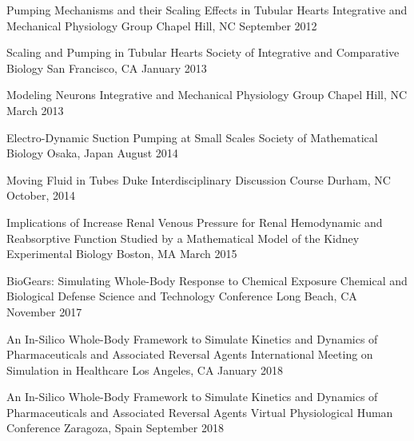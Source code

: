 
\begin{cventries}
    \cventry
    {Pumping Mechanisms and their Scaling Effects in Tubular Hearts} %
    {Integrative and Mechanical Physiology Group} %
    {Chapel Hill, NC} %
    {September 2012} %
    {
    }

    \cventry
    {Scaling and Pumping in Tubular Hearts} %
    {Society of Integrative and Comparative Biology} %
    {San Francisco, CA} %
    {January 2013} %
    {
    }


    \cventry
    {Modeling Neurons} %
    {Integrative and Mechanical Physiology Group} %
    {Chapel Hill, NC} %
    {March 2013} %
    {
    }

    \cventry
    {Electro-Dynamic Suction Pumping at Small Scales} %
    {Society of Mathematical Biology} %
    {Osaka, Japan} %
    {August 2014} %
    {
    }

    \cventry
    {Moving Fluid in Tubes} %
    {Duke Interdisciplinary Discussion Course} %
    {Durham, NC} %
    {October, 2014} %
    {
    }

     \cventry
    {Implications of Increase Renal Venous Pressure for Renal Hemodynamic and Reabsorptive Function Studied by a Mathematical Model of the Kidney} %
    {Experimental Biology} %
    {Boston, MA} %
    {March 2015} %
    {
    }

      \cventry
    {BioGears: Simulating Whole-Body Response to Chemical Exposure} %
    {Chemical and Biological Defense Science and Technology Conference} %
    {Long Beach, CA} %
    {November 2017} %
    {
    }


  \cventry
    {An In-Silico Whole-Body Framework to Simulate Kinetics and Dynamics of Pharmaceuticals and Associated Reversal Agents} %
    {International Meeting on Simulation in Healthcare} %
    {Los Angeles, CA} %
    {January 2018} %
    {
    }

  \cventry
    {An In-Silico Whole-Body Framework to Simulate Kinetics and Dynamics of Pharmaceuticals and Associated Reversal Agents} %
    {Virtual Physiological Human Conference} %
    {Zaragoza, Spain} %
    {September 2018} %
    {
    }


\end{cventries}
